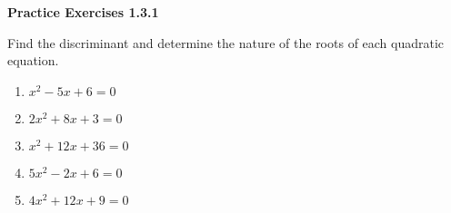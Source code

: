 \vspace{-0.5ex}
\noindent\textbf{Practice Exercises 1.3.1}


Find the discriminant and determine the nature of the roots of each quadratic equation. 
\begin{multicols}{2}
\begin{enumerate}[label = \color{blue}\arabic*. ]
   \item $ x^2 - 5x + 6 = 0 $
   \item $ 2x^2 + 8x + 3 = 0 $
   \item $ x^2 + 12x + 36 = 0 $
   \item $ 5x^2 - 2x + 6 = 0 $
   \item $ 4x^2 + 12x + 9 = 0 $
\end{enumerate}
\end{multicols} 